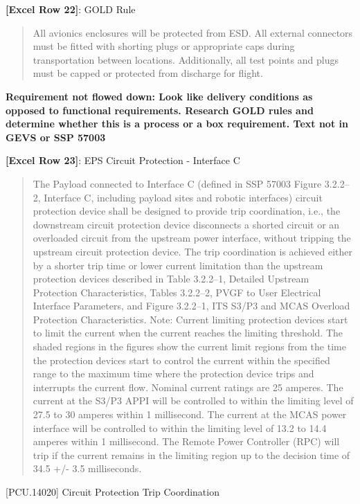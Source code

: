 \textbf{[Excel Row 22]}: GOLD Rule

\begin{quote}
All avionics enclosures will be protected from ESD. All external connectors must be fitted with shorting plugs or appropriate caps during transportation between locations. Additionally, all test points and plugs must be capped or protected from discharge for flight.
\end{quote}

\textbf{Requirement not flowed down: Look like delivery conditions as opposed to functional requirements. Research GOLD rules and determine whether this is a process or a box requirement. Text not in GEVS or SSP 57003}

\textbf{[Excel Row 23]}: EPS Circuit Protection - Interface C

\begin{quote}
The Payload connected to Interface C (defined in SSP 57003 Figure 3.2.2--2, Interface C, including payload sites and robotic interfaces) circuit protection device shall be designed to provide trip coordination, i.e., the downstream circuit protection device disconnects a shorted circuit or an overloaded circuit from the upstream power interface, without tripping the upstream circuit protection device. The trip coordination is achieved either by a shorter trip time or lower current limitation than the upstream protection devices described in Table 3.2.2--1, Detailed Upstream Protection Characteristics, Tables 3.2.2--2, PVGF to User Electrical Interface Parameters, and Figure 3.2.2--1, ITS S3\slash P3 and MCAS Overload Protection Characteristics.
Note: Current limiting protection devices start to limit the current when the current reaches the limiting threshold. The shaded regions in the figures show the current limit regions from the time the protection devices start to control the current within the specified range to the maximum time where the protection device trips and interrupts the current flow. Nominal current ratings are 25 amperes. The current at the S3\slash P3 APPI will be controlled to within the limiting level of 27.5 to 30 amperes within 1 millisecond. The current at the MCAS power interface will be controlled to within the limiting level of 13.2 to 14.4 amperes within 1 millisecond. The Remote Power Controller (RPC) will trip if the current remains in the limiting region up to the decision time of 34.5 +\slash - 3.5 milliseconds.
\end{quote}

[PCU.14020] Circuit Protection Trip Coordination

